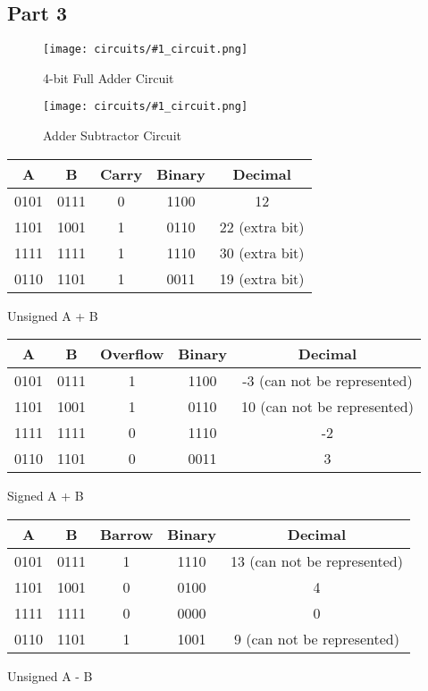 \documentclass[pdftex,12pt,a4paper]{article}
\theoremstyle{plain}
\newcommand{\circuit}[1]{
    \begin{figure}[H]
    	\centering
    	\texttt{[image: circuits/\#1\_circuit.png]}
    	\caption{#1 Circuit}
    	\label{fig7}
    \end{figure}
    \vspace{1cm}
}
\begin{document}
    \subsection{Part 3}
    \circuit{4-bit Full Adder}
    \circuit{Adder Subtractor}
        \begin{center}
            \begin{tabular}{c c | c c c}
                A & B & Carry & Binary & Decimal \\
                \hline 
                0101 & 0111 & 0 & 1100 & 12 \\
                1101 & 1001 & 1 & 0110 & 22 (extra bit)\\
                1111 & 1111 & 1 & 1110 & 30 (extra bit)\\
                0110 & 1101 & 1 & 0011 & 19 (extra bit)\\
            \end{tabular}
            \vspace{0.3cm}
        \end{center}
        {\centering Unsigned A + B\\}

        \begin{center}
            \vspace{0.3cm}
            \begin{tabular}{c c | c c c}
                A & B & Overflow & Binary & Decimal \\
                \hline 
                0101 & 0111 & 1 & 1100 & -3 (can not be represented) \\
                1101 & 1001 & 1 & 0110 & 10 (can not be represented)\\
                1111 & 1111 & 0 & 1110 & -2\\
                0110 & 1101 & 0 & 0011 & 3\\
            \end{tabular}
            \vspace{0.3cm}
        \end{center}
        {\centering Signed A + B\\}

        \begin{center}
            \vspace{0.3cm}
            \begin{tabular}{c c | c c c}
                A & B & Barrow & Binary & Decimal \\
                \hline 
                0101 & 0111 & 1 & 1110 & 13 (can not be represented) \\
                1101 & 1001 & 0 & 0100 & 4\\
                1111 & 1111 & 0 & 0000 & 0\\
                0110 & 1101 & 1 & 1001 & 9 (can not be represented)\\
            \end{tabular}
            \vspace{0.3cm}
        \end{center}
        {\centering Unsigned A - B\\}
\end{document}
